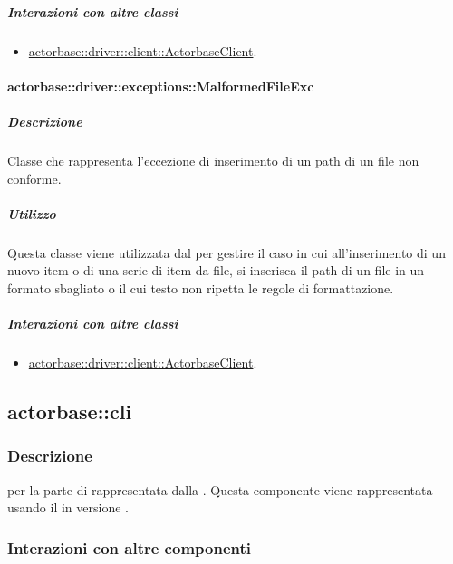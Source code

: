 \documentclass{scalatekids-article}
\begin{document}
\subparagraph{Interazioni con altre classi}

\begin{itemize}
	\item \hyperref[sec:actorbase::driver::client::ActorbaseClient]{actorbase::driver::client::ActorbaseClient}.
\end{itemize}

\paragraph{actorbase::driver::exceptions::MalformedFileExc}

\subparagraph{Descrizione}

Classe che rappresenta l'eccezione di inserimento di un path di un file non conforme.

\subparagraph{Utilizzo}

Questa classe viene utilizzata dal  per gestire il caso in cui all'inserimento di un nuovo item o di una serie di item da file, si inserisca il path di un file in un formato sbagliato o il cui testo non ripetta le regole di formattazione.

\subparagraph{Interazioni con altre classi}

\begin{itemize}
	\item \hyperref[sec:actorbase::driver::client::ActorbaseClient]{actorbase::driver::client::ActorbaseClient}.
\end{itemize}


\subsection{actorbase::cli}
\label{sec:actorbase::cli}

\subsubsection{Descrizione}

 per la parte di  rappresentata dalla .
Questa componente viene rappresentata usando il 
 in versione .

\subsubsection{Interazioni con altre componenti}
\end{document}
